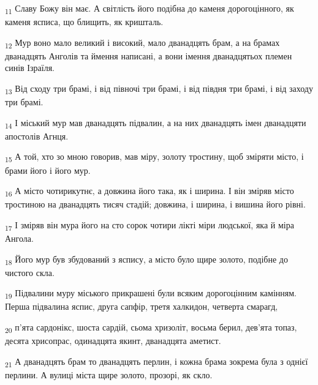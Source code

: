 \begin{tcolorbox}
\textsubscript{11} Славу Божу він має. А світлість його подібна до каменя дорогоцінного, як каменя ясписа, що блищить, як кришталь.
\end{tcolorbox}
\begin{tcolorbox}
\textsubscript{12} Мур воно мало великий і високий, мало дванадцять брам, а на брамах дванадцять Анголів та ймення написані, а вони імення дванадцятьох племен синів Ізраїля.
\end{tcolorbox}
\begin{tcolorbox}
\textsubscript{13} Від сходу три брамі, і від півночі три брамі, і від півдня три брамі, і від заходу три брамі.
\end{tcolorbox}
\begin{tcolorbox}
\textsubscript{14} І міський мур мав дванадцять підвалин, а на них дванадцять імен дванадцяти апостолів Агнця.
\end{tcolorbox}
\begin{tcolorbox}
\textsubscript{15} А той, хто зо мною говорив, мав міру, золоту тростину, щоб зміряти місто, і брами його і його мур.
\end{tcolorbox}
\begin{tcolorbox}
\textsubscript{16} А місто чотирикутнє, а довжина його така, як і ширина. І він зміряв місто тростиною на дванадцять тисяч стадій; довжина, і ширина, і вишина його рівні.
\end{tcolorbox}
\begin{tcolorbox}
\textsubscript{17} І зміряв він мура його на сто сорок чотири лікті міри людської, яка й міра Ангола.
\end{tcolorbox}
\begin{tcolorbox}
\textsubscript{18} Його мур був збудований з яспису, а місто було щире золото, подібне до чистого скла.
\end{tcolorbox}
\begin{tcolorbox}
\textsubscript{19} Підвалини муру міського прикрашені були всяким дорогоцінним камінням. Перша підвалина яспис, друга сапфір, третя халкидон, четверта смарагд,
\end{tcolorbox}
\begin{tcolorbox}
\textsubscript{20} п'ята сардонікс, шоста сардій, сьома хризоліт, восьма берил, дев'ята топаз, десята хрисопрас, одинадцята якинт, дванадцята аметист.
\end{tcolorbox}
\begin{tcolorbox}
\textsubscript{21} А дванадцять брам то дванадцять перлин, і кожна брама зокрема була з однієї перлини. А вулиці міста щире золото, прозорі, як скло.
\end{tcolorbox}
